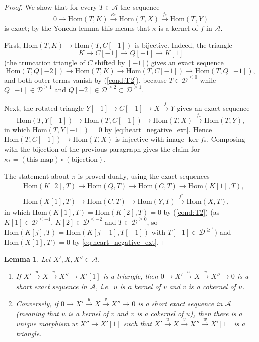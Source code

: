 \documentclass[12pt]{amsart}
\newcommand{\condref}[1]{\textup{(\ref{#1})}}
\newtheorem{lemma}[theorem]{Lemma}
\numberwithin{theorem}{section}
\theoremstyle{definition}
\newcommand{\calA}{\mathcal{A}}
\newcommand{\Hom}{\mathrm{Hom}}
\newcommand{\calD}{\mathcal{D}}
\newcommand{\Dle}[1]{\calD^{\leqslant #1}}
\newcommand{\Dge}[1]{\calD^{\geqslant #1}}
\begin{document}
	\begin{proof}
		We show that for every $T \in \calA$ the sequence
		\[
		0 \to \Hom(T, K) \xrightarrow{\kappa_*} \Hom(T, X) \xrightarrow{f_*} \Hom(T, Y)
		\]
		is exact; by the Yoneda lemma this means that $\kappa$ is a kernel of $f$ in $\calA$.
		
		First, $\Hom(T, K) \to \Hom(T, C[-1])$ is bijective.
		Indeed, the triangle 
		\[
		K \to C[-1] \to Q[-1] \to K[1]
		\] 
		(the truncation triangle of $C$ shifted by $[-1]$) gives an exact sequence
		\[
		\Hom(T, Q[-2]) \to \Hom(T, K) \to \Hom(T, C[-1]) \to \Hom(T, Q[-1]) ,
		\]
		and both outer terms vanish by \condref{cond:T2}, because $T \in \Dle{0}$ while $Q[-1] \in \Dge{1}$ and $Q[-2] \in \Dge{2} \subset \Dge{1}$.
		
		Next, the rotated triangle $Y[-1] \to C[-1] \to X \xrightarrow{f} Y$ gives an exact sequence
		\[
		\Hom(T, Y[-1]) \to \Hom(T, C[-1]) \to \Hom(T, X) \xrightarrow{f_*} \Hom(T, Y) ,
		\]
		in which $\Hom(T, Y[-1]) = 0$ by \eqref{eq:heart_negative_ext}.
		Hence $\Hom(T, C[-1]) \to \Hom(T, X)$ is injective with image $\ker f_*$.
		Composing with the bijection of the previous paragraph gives the claim for $\kappa_* = (\text{this map}) \circ (\text{bijection})$.
		
		The statement about $\pi$ is proved dually, using the exact sequences
		\begin{align*}
			&\Hom(K[2], T) \to \Hom(Q, T) \to \Hom(C, T) \to \Hom(K[1], T), \\
			&\Hom(X[1], T) \to \Hom(C, T) \to \Hom(Y, T) \xrightarrow{f^*} \Hom(X, T),
		\end{align*}
		in which $\Hom(K[1], T) = \Hom(K[2], T) = 0$ by \condref{cond:T2} (as $K[1] \in \Dle{-1}$, $K[2] \in \Dle{-2}$ and $T \in \Dge{0}$, so $\Hom(K[j], T) = \Hom(K[j-1], T[-1])$ with $T[-1] \in \Dge{1}$) and $\Hom(X[1], T) = 0$ by \eqref{eq:heart_negative_ext}.
	\end{proof}
	
	\begin{lemma}
		\label{lem:triangles_vs_ses}
		Let $X', X, X'' \in \calA$.
		\begin{enumerate}
			\item If $X' \xrightarrow{u} X \xrightarrow{v} X'' \to X'[1]$ is a triangle, then $0 \to X' \xrightarrow{u} X \xrightarrow{v} X'' \to 0$ is a short exact sequence in $\calA$, i.e.\ $u$ is a kernel of $v$ and $v$ is a cokernel of $u$.
			\item Conversely, if $0 \to X' \xrightarrow{u} X \xrightarrow{v} X'' \to 0$ is a short exact sequence in $\calA$ (meaning that $u$ is a kernel of $v$ and $v$ is a cokernel of $u$), then there is a unique morphism $w \colon X'' \to X'[1]$ such that $X' \xrightarrow{u} X \xrightarrow{v} X'' \xrightarrow{w} X'[1]$ is a triangle.
		\end{enumerate}
	\end{lemma}
	
\end{document}

